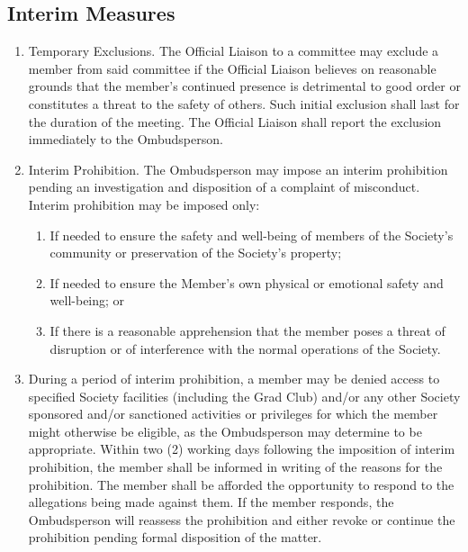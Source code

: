 \subsection{Interim Measures}
\begin{enumerate} [align=left]
\item Temporary Exclusions. The Official Liaison to a committee may exclude a member from said committee if the Official Liaison believes on reasonable grounds that the member's continued presence is detrimental to good order or constitutes a threat to the safety of others. Such initial exclusion shall last for the duration of the meeting. The Official Liaison shall report the exclusion immediately to the Ombudsperson.
\item Interim Prohibition. The Ombudsperson may impose an interim prohibition pending an investigation and disposition of a complaint of misconduct. Interim prohibition may be imposed only:
\begin{enumerate} [label*=\arabic*., align=left]
\item If needed to ensure the safety and well-being of members of the Society's community or preservation of the Society's property;
\item If needed to ensure the Member's own physical or emotional safety and well-being; or
\item If there is a reasonable apprehension that the member poses a threat of disruption or of interference with the normal operations of the Society.
\end{enumerate}
\item During a period of interim prohibition, a member may be denied access to specified Society facilities (including the Grad Club) and/or any other Society sponsored and/or sanctioned activities or privileges for which the member might otherwise be eligible, as the Ombudsperson may determine to be appropriate. Within two (2) working days following the imposition of interim prohibition, the member shall be informed in writing of the reasons for the prohibition. The member shall be afforded the opportunity to respond to the allegations being made against them. If the member responds, the Ombudsperson will reassess the prohibition and either revoke or continue the prohibition pending formal disposition of the matter.
\end{enumerate}

